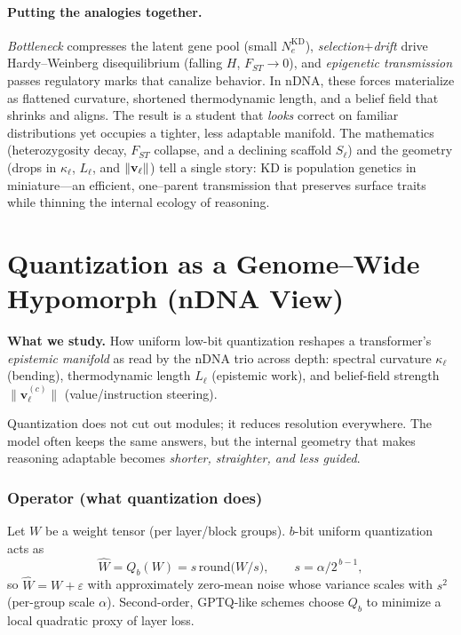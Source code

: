 \paragraph{Putting the analogies together.}
\emph{Bottleneck} compresses the latent gene pool (small $N_e^{\mathrm{KD}}$), \emph{selection}$+$\emph{drift} drive Hardy–Weinberg disequilibrium (falling $H$, $F_{ST}\!\to\!0$), and \emph{epigenetic transmission} passes regulatory marks that canalize behavior. In nDNA, these forces materialize as flattened curvature, shortened thermodynamic length, and a belief field that shrinks and aligns. The result is a student that \emph{looks} correct on familiar distributions yet occupies a tighter, less adaptable manifold. The mathematics (heterozygosity decay, $F_{ST}$ collapse, and a declining scaffold $S_\ell$) and the geometry (drops in $\kappa_\ell$, $L_\ell$, and $\|{\bf v}_\ell\|$) tell a single story: KD is population genetics in miniature—an efficient, one–parent transmission that preserves surface traits while thinning the internal ecology of reasoning.



\clearpage
\newpage


\section*{Quantization as a Genome--Wide Hypomorph (nDNA View)}
\noindent\textbf{What we study.} How uniform low-bit quantization reshapes a transformer's \emph{epistemic manifold} as read by the nDNA trio across depth: spectral curvature $\kappa_\ell$ (bending), thermodynamic length $L_\ell$ (epistemic work), and belief-field strength $\|\mathbf v^{(c)}_\ell\|$ (value/instruction steering).

\begin{tcolorbox}[colback=black!3,colframe=black!40,title=\textbf{Plain-language summary}]
Quantization does not cut out modules; it reduces resolution everywhere. The model often keeps the same answers, but the internal geometry that makes reasoning adaptable becomes \emph{shorter, straighter, and less guided}.
\end{tcolorbox}

\subsubsection*{Operator (what quantization does)}
Let $W$ be a weight tensor (per layer/block groups). $b$-bit uniform quantization acts as
\[
\widehat W=Q_b(W)=s\,\mathrm{round}\!\big(W/s\big), \qquad s=\alpha/2^{\,b-1},
\]
so $\widehat W=W+\varepsilon$ with approximately zero-mean noise whose variance scales with $s^2$ (per-group scale $\alpha$).
Second-order, GPTQ-like schemes choose $Q_b$ to minimize a local quadratic proxy of layer loss.


